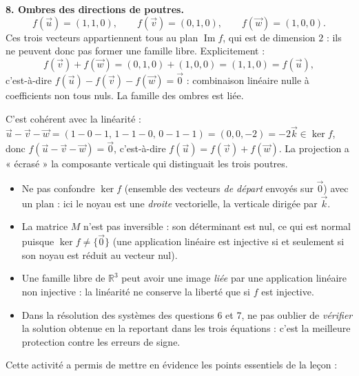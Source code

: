 \documentclass[11pt]{article}
\newcommand{\cle}[1]{{\popxbold\color{popdark}#1}}
\newcounter{popsec}
\newcounter{popsub}
\newcommand{\courssub}[1]{%
  \stepcounter{popsub}%
  \par\vspace{9pt}\noindent{\popxbold\fontsize{11.5}{13}\selectfont\color{popink}{\color{poporange}\thepopsec.\thepopsub}\hspace{6pt}#1}\par\nopagebreak\vspace{4pt}
}
\begin{document}
\begin{exoresolu}
\textbf{8. Ombres des directions de poutres.}
\[
f(\vec{u}) = (1,1,0), \qquad f(\vec{v}) = (0,1,0), \qquad f(\vec{w}) = (1,0,0).
\]
Ces trois vecteurs appartiennent tous au plan $\operatorname{Im} f$, qui est de dimension $2$ : ils ne peuvent donc pas former une famille libre. Explicitement :
\[
f(\vec{v}) + f(\vec{w}) = (0,1,0) + (1,0,0) = (1,1,0) = f(\vec{u}),
\]
c'est-à-dire $f(\vec{u}) - f(\vec{v}) - f(\vec{w}) = \vec{0}$ : combinaison linéaire nulle à coefficients non tous nuls. La famille des ombres est \cle{liée}.

C'est cohérent avec la linéarité : $\vec{u} - \vec{v} - \vec{w} = (1-0-1,\, 1-1-0,\, 0-1-1) = (0,0,-2) = -2\vec{k} \in \ker f$, donc $f(\vec{u} - \vec{v} - \vec{w}) = \vec{0}$, c'est-à-dire $f(\vec{u}) = f(\vec{v}) + f(\vec{w})$. La projection a « écrasé » la composante verticale qui distinguait les trois poutres.
\end{exoresolu}

\begin{attention}
\begin{itemize}
\item Ne pas confondre $\ker f$ (ensemble des vecteurs \emph{de départ} envoyés sur $\vec{0}$) avec un plan : ici le noyau est une \emph{droite} vectorielle, la verticale dirigée par $\vec{k}$.
\item La matrice $M$ n'est pas inversible : son déterminant est nul, ce qui est normal puisque $\ker f \neq \{\vec{0}\}$ (une application linéaire est injective si et seulement si son noyau est réduit au vecteur nul).
\item Une famille libre de $\mathbb{R}^3$ peut avoir une image \emph{liée} par une application linéaire non injective : la linéarité ne conserve la liberté que si $f$ est injective.
\item Dans la résolution des systèmes des questions 6 et 7, ne pas oublier de \emph{vérifier} la solution obtenue en la reportant dans les trois équations : c'est la meilleure protection contre les erreurs de signe.
\end{itemize}
\end{attention}

\courssub{Bilan de l'activité}

Cette activité a permis de mettre en évidence les points essentiels de la leçon :
\end{document}
